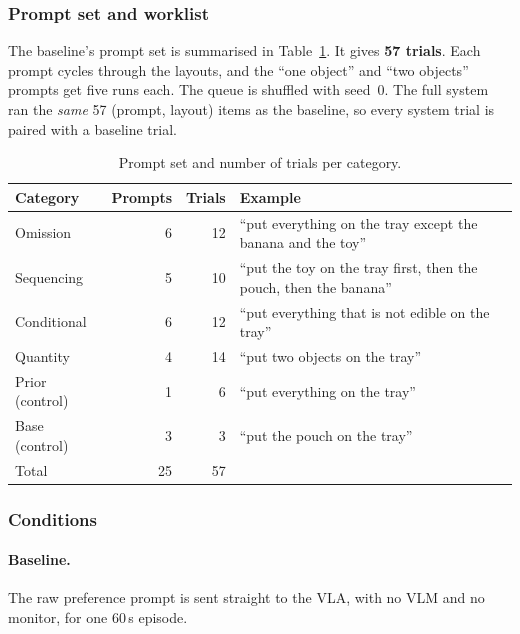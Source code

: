 \subsubsection{Prompt set and worklist}
The baseline's prompt set is summarised in Table~\ref{tab:pref-prompts}. It gives
\textbf{57 trials}. Each prompt cycles through the layouts, and the ``one object'' and
``two objects'' prompts get five runs each. The queue is shuffled with seed~0. The full
system ran the \emph{same} 57 (prompt, layout) items as the baseline, so every system
trial is paired with a baseline trial.

\begin{table}[t]
  \centering
  \caption{Prompt set and number of trials per category.}
  \label{tab:pref-prompts}
  \begin{tabularx}{\linewidth}{lrrX}
    \toprule
    Category & Prompts & Trials & Example \\
    \midrule
    Omission        & 6 & 12 & ``put everything on the tray except the banana and the toy'' \\
    Sequencing      & 5 & 10 & ``put the toy on the tray first, then the pouch, then the banana'' \\
    Conditional     & 6 & 12 & ``put everything that is not edible on the tray'' \\
    Quantity        & 4 & 14 & ``put two objects on the tray'' \\
    Prior (control) & 1 &  6 & ``put everything on the tray'' \\
    Base (control)  & 3 &  3 & ``put the pouch on the tray'' \\
    \midrule
    Total           & 25 & 57 & \\
    \bottomrule
  \end{tabularx}
\end{table}

\subsubsection{Conditions}
\paragraph{Baseline.} The raw preference prompt is sent straight to the VLA, with no VLM
and no monitor, for one 60\,s episode.

